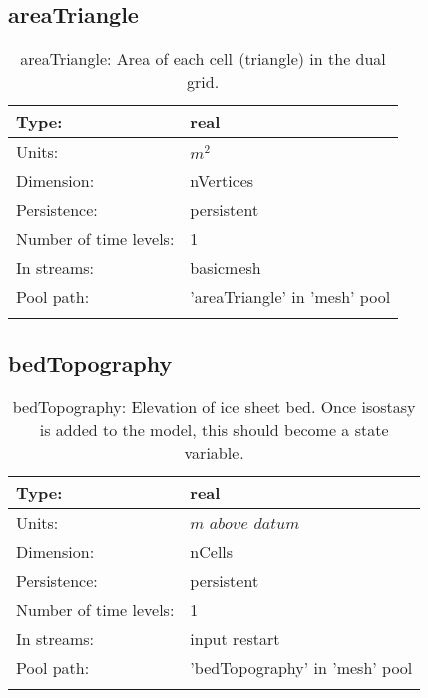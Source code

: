 \subsection[areaTriangle]{areaTriangle}
\label{subsec:var_sec_mesh_areaTriangle}
\begin{center}
\begin{longtable}{| p{2.0in} | p{4.0in} |}
        \hline 
        Type: & real \\
        \hline 
        Units: & $m^2$ \\
        \hline 
        Dimension: & nVertices \\
        \hline 
        Persistence: & persistent \\
        \hline 
        Number of time levels: & 1 \\
        \hline 
		 In streams: &  basicmesh \\
        \hline 
            Pool path: & 'areaTriangle' in 'mesh' pool
 \\
		 \hline 
    \caption{areaTriangle: Area of each cell (triangle) in the dual grid.}
\end{longtable}
\end{center}
\subsection[bedTopography]{bedTopography}
\label{subsec:var_sec_mesh_bedTopography}
\begin{center}
\begin{longtable}{| p{2.0in} | p{4.0in} |}
        \hline 
        Type: & real \\
        \hline 
        Units: & $m$ $above$ $datum$ \\
        \hline 
        Dimension: & nCells \\
        \hline 
        Persistence: & persistent \\
        \hline 
        Number of time levels: & 1 \\
        \hline 
		 In streams: &  input restart \\
        \hline 
            Pool path: & 'bedTopography' in 'mesh' pool
 \\
		 \hline 
    \caption{bedTopography: Elevation of ice sheet bed.  Once isostasy is added to the model, this should become a state variable.}
\end{longtable}
\end{center}
